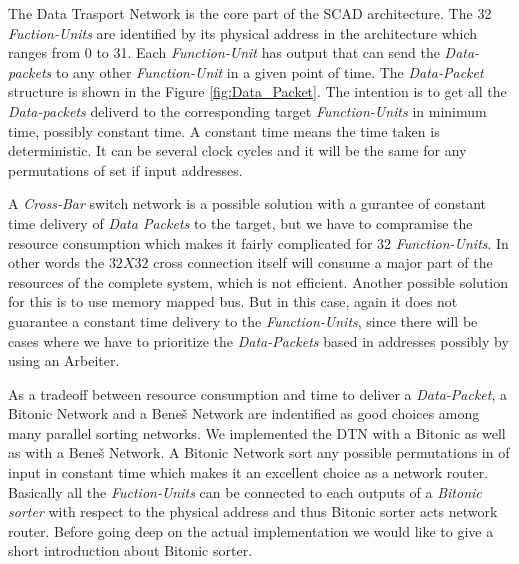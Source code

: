 		
		
		The Data Trasport Network is the core part of the SCAD architecture. The 32 \textit{Fuction-Units} are identified by its physical address in the architecture which ranges from 0 to 31. Each \textit{Function-Unit} has output 
		that can send the \textit{Data-packets} to any other \textit{Function-Unit} in a given point of time. The \textit{Data-Packet} structure is shown in the Figure \ref{fig:Data_Packet}. The intention is to get all the \textit{Data-packets}
		deliverd to the corresponding target \textit{Function-Units} in minimum time, possibly constant time. A constant time means the time taken is deterministic. It can be several clock cycles and it will be the same for 
		any permutations of set if input addresses.
		
		A \textit{Cross-Bar} switch network is a possible solution with a gurantee of constant time delivery of \textit{Data Packets} to the target, but we have to compramise the resource consumption which makes it fairly complicated 
		for 32 \textit{Function-Units}. In other words the $32 X 32$ cross connection itself will consume a major part of the resources of the complete system, which is not efficient. Another possible solution for this is to use 
		memory mapped bus. But in this case, again it does not guarantee a constant time delivery to the \textit{Function-Units}, since there will be cases where we have to prioritize the \textit{Data-Packets} based in addresses possibly 
		by using an Arbeiter. 
		
		As a tradeoff between resource consumption and time to deliver a \textit{Data-Packet}, a {Bitonic Network} and a {Beneš Network} are indentified as good choices among many parallel sorting networks. 
		We implemented the DTN with a Bitonic as well as with a Beneš Network. A {Bitonic Network} sort any possible permutations in of input in constant time which makes it an excellent choice as a network router.
		Basically all the \textit{Fuction-Units} can be connected to each outputs of a \textit{Bitonic sorter} with respect to the physical address and thus {Bitonic sorter} acts network router. 
		Before going deep on the actual implementation we would like to give a short introduction about {Bitonic sorter}.

